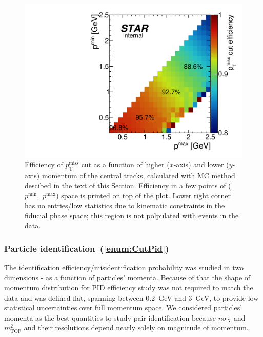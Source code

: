 \begin{figure}[h]
\centering%
\parbox{0.4725\textwidth}{%
  \centering%
  \includegraphics[width=\linewidth]{graphics/corrections/ptmisscuteff.pdf}
}%
\quad%
\parbox{0.4725\textwidth}{%
    \caption[Efficiency of $p_{\text{T}}^{\text{miss}}$ cut as a function of central tracks' momenta.]{Efficiency of $p_{\text{T}}^{\text{miss}}$ cut as a function of higher ($x$-axis) and lower ($y$-axis) momentum of the central tracks, calculated with MC method descibed in the text of this Section. Efficiency in a few points of ($p^{\text{min}}$,~$p^{\text{max}}$) space is printed on top of the plot. Lower right corner has no entries/low statistics due to kinematic constraints in the fiducial phase space; this region is not polpulated with events in the data.}\label{fig:ptMissCutEff}%
}
\end{figure}


\subsubsection{Particle identification~(\ref{enum:CutPid})}\label{sec:pidEff}

The identification efficiency/misidentification probability was studied in two dimensions - as a function of particles' momenta. Because of that the shape of momentum distribution for PID efficiency study was not required to match the data and was defined flat, spanning between $0.2$~GeV and 3~GeV, to provide low statistical uncertainties over full momentum space. We considered particles' momenta as the best quantities to study pair identification because $n\sigma_{X}$ and $m^{2}_{\text{TOF}}$ and their resolutions depend nearly solely on magnitude of momentum.


